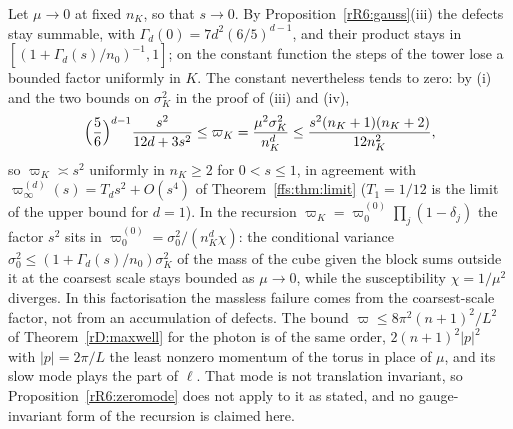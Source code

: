 \begin{remark}\label{rR6:massless}
Let $\mu\to0$ at fixed $n_K$, so that $s\to0$. By
Proposition~\ref{rR6:gauss}(iii) the defects stay summable, with
$\Gamma_d(0)=7d^2(6/5)^{d-1}$, and their product stays in
$[(1+\Gamma_d(s)/n_0)^{-1},1]$; on the constant function the steps of the
tower lose a bounded factor uniformly in $K$. The constant nevertheless tends to zero: by (i) and the
two bounds on $\sigma_K^2$ in the proof of (iii) and (iv),
\[
\Bigl(\frac56\Bigr)^{d-1}\frac{s^2}{12d+3s^2}\le\varpi_K=\frac{\mu^2
\sigma_K^2}{n_K^d}\le\frac{s^2(n_K+1)(n_K+2)}{12n_K^2},
\]
so $\varpi_K\asymp s^2$ uniformly in $n_K\ge2$ for $0<s\le1$, in agreement with
$\varpi^{(d)}_\infty(s)=T_ds^2+O(s^4)$ of Theorem~\ref{ffs:thm:limit}
($T_1=1/12$ is the limit of the upper bound for $d=1$). In the recursion
$\varpi_K=\varpi^{(0)}_0\prod_j(1-\delta_j)$ the factor $s^2$ sits in
$\varpi^{(0)}_0=\sigma_0^2/(n_K^d\chi)$: the conditional variance $\sigma_0^2
\le(1+\Gamma_d(s)/n_0)\sigma_K^2$ of the mass of the cube given the block
sums outside it at the coarsest scale stays bounded as $\mu\to0$, while the
susceptibility $\chi=1/\mu^2$ diverges. In this factorisation the massless
failure comes from the coarsest-scale factor, not from an accumulation of
defects. The bound $\varpi\le8\pi^2(n+1)^2/L^2$ of
Theorem~\ref{rD:maxwell} for the photon is of the same order,
$2(n+1)^2\lvert p\rvert^2$ with $\lvert p\rvert=2\pi/L$ the least nonzero
momentum of the torus in place of $\mu$, and its slow mode plays the part
of $\ell$. That mode is not translation invariant, so
Proposition~\ref{rR6:zeromode} does not apply to it as stated, and no
gauge-invariant form of the recursion is claimed here.
\end{remark}

